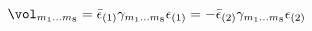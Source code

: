 \begin{equation}
   \vol_{m_1\dots m_8} 
      = \bar{\epsilon}_{(1)}\gamma_{m_1\dots m_8}\epsilon_{(1)}
      = - \bar{\epsilon}_{(2)}\gamma_{m_1\dots m_8}\epsilon_{(2)}
\end{equation}

